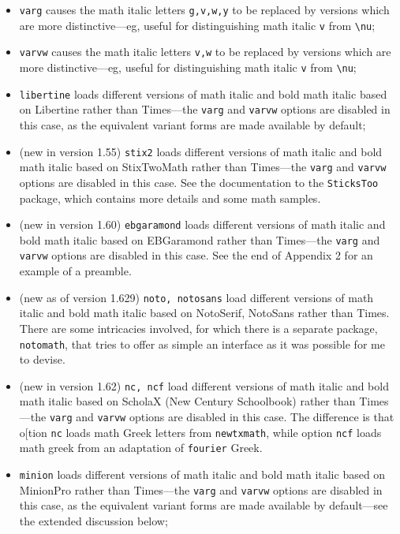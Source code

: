 \documentclass[11pt]{article}
\theoremstyle{oldplain}
\theoremstyle{plain}
\begin{document}
\begin{itemize}
\begin{verbatim}
\def\setSYdimens{\fontdimen16\font=2pt\fontdimen17\font=1.15\fontdimen17\font }
\end{verbatim}
Don't use these unless you know what you're doing.
\item {\tt varg} causes the math italic letters \verb|g,v,w,y| to be replaced by versions which are more distinctive---eg, useful for distinguishing math italic \verb|v| from \verb|\nu|;
\item {\tt varvw} causes the math italic letters \verb|v,w| to be replaced by versions which are more distinctive---eg, useful for distinguishing math italic \verb|v| from \verb|\nu|;
\item {\tt libertine} loads different versions of math italic and bold math italic based on \textsf{Libertine} rather than \textsf{Times}---the {\tt varg} and {\tt varvw} options are disabled in this case, as the equivalent variant forms are made available by default;
\item (new in version 1.55) {\tt stix2} loads different versions of math italic and bold math italic based on \textsf{StixTwoMath} rather than \textsf{Times}---the {\tt varg} and {\tt varvw} options are disabled in this case. See the documentation to the {\tt SticksToo} package, which contains more details and some math samples.
\item (new in version 1.60) {\tt ebgaramond} loads different versions of math italic and bold math italic based on \textsf{EBGaramond} rather than \textsf{Times}---the {\tt varg} and {\tt varvw} options are disabled in this case. See the end of Appendix 2 for an example of a preamble.
\item (new as of version 1.629) {\tt noto, notosans} load different versions of math italic and bold math italic based on \textsf{NotoSerif}, \textsf{NotoSans}  rather than \textsf{Times}. There are some intricacies involved, for which there is a separate package, {\tt notomath}, that tries to offer as simple an interface as it was possible for me to devise.
\item (new in version 1.62) {\tt nc, ncf} load different versions of math italic and bold math italic based on \textsf{ScholaX} (\textsf{New Century Schoolbook}) rather than \textsf{Times}---the {\tt varg} and {\tt varvw} options are disabled in this case. The difference is that o[tion {\tt nc} loads math Greek letters from {\tt newtxmath}, while option {\tt ncf} loads math greek from an adaptation of {\tt fourier} Greek.
\item {\tt minion} loads different versions of math italic and bold math italic based on \textsf{MinionPro} rather than \textsf{Times}---the {\tt varg} and {\tt varvw} options are disabled in this case, as the equivalent variant forms are made available by default---see the extended discussion below;

\end{itemize}
\end{document}

